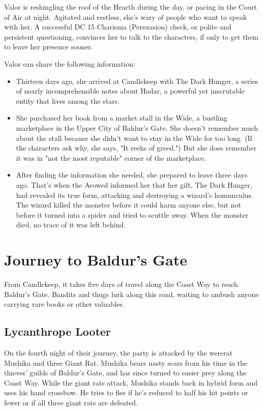\documentclass[10pt,a4paper,twoside,bg=print,twocolumn,openany,nodeprecatedcode]{dndbook}
\begin{document}
Valor is reshingling the roof of the Hearth during the day, or pacing in the Court of Air at night. Agitated and restless, she's wary of people who want to speak with her. A successful DC 15 Charisma (Persuasion) check, or polite and persistent questioning, convinces her to talk to the characters, if only to get them to leave her presence sooner.

Valor can share the following information:


\begin{itemize}
\item Thirteen days ago, she arrived at Candlekeep with The Dark Hunger, a series of nearly incomprehensible notes about Hadar, a powerful yet inscrutable entity that lives among the stars.
\item She purchased her book from a market stall in the Wide, a bustling marketplace in the Upper City of Baldur's Gate. She doesn't remember much about the stall because she didn't want to stay in the Wide for too long. (If the characters ask why, she says, "It reeks of greed.") But she does remember it was in "not the most reputable" corner of the marketplace.
\item After finding the information she needed, she prepared to leave three days ago. That's when the Avowed informed her that her gift, The Dark Hunger, had revealed its true form, attacking and destroying a wizard's homunculus. The wizard killed the monster before it could harm anyone else, but not before it turned into a spider and tried to scuttle away. When the monster died, no trace of it was left behind.
\end{itemize}

\section{Journey to Baldur's Gate}
From Candlekeep, it takes five days of travel along the Coast Way to reach Baldur's Gate. Bandits and thugs lurk along this road, waiting to ambush anyone carrying rare books or other valuables.

\subsection{Lycanthrope Looter}
On the fourth night of their journey, the party is attacked by the wererat Mushika and three Giant Rat. Mushika bears nasty scars from his time in the thieves' guilds of Baldur's Gate, and has since turned to easier prey along the Coast Way. While the giant rats attack, Mushika stands back in hybrid form and uses his hand crossbow. He tries to flee if he's reduced to half his hit points or fewer or if all three giant rats are defeated.
\end{document}
